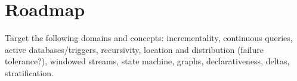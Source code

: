 \documentclass[11pt]{article}
\begin{document}
%

\section{Roadmap}
Target the following domains and concepts: incrementality, continuous queries, active databases/triggers, recursivity, location and distribution (failure tolerance?), windowed streams, state machine, graphs, declarativeness, deltas, stratification.
\end{document}
